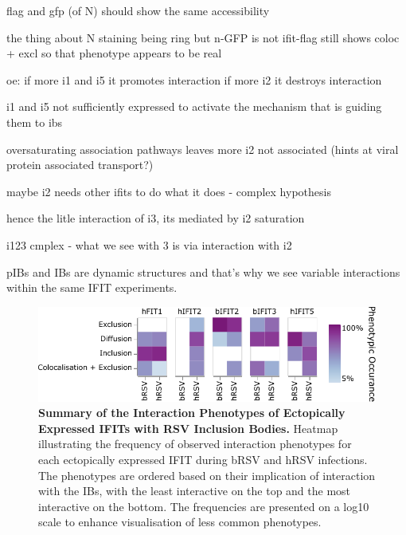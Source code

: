 flag and gfp (of N) should show the same accessibility

the thing about N staining being ring but n-GFP is not
ifit-flag still shows coloc + excl so that phenotype appears to be real

oe:
if more i1 and i5 it promotes interaction
if more i2 it destroys interaction


i1 and i5 not sufficiently expressed to activate the mechanism that is guiding them to ibs

oversaturating association pathways leaves more i2 not associated (hints at viral protein associated transport?)

maybe i2 needs other ifits to do what it does - complex hypothesis

hence the litle interaction of i3, its mediated by i2 saturation

i123 cmplex - what we see with 3 is via interaction with i2

pIBs and IBs are dynamic structures and that's why we see variable interactions within the same IFIT experiments.

\begin{figure}
    \centering
    \includegraphics[width=1\linewidth]{09. Chapter 4/Figs/heatmap-infection-transfection.pdf}
    \caption[Summary of the Interaction Phenotypes of Ectopically Expressed IFITs with RSV Inclusion Bodies.]{\textbf{Summary of the Interaction Phenotypes of Ectopically Expressed IFITs with RSV Inclusion Bodies.} Heatmap illustrating the frequency of observed interaction phenotypes for each ectopically expressed IFIT during bRSV and hRSV infections. The phenotypes are ordered based on their implication of interaction with the IBs, with the least interactive on the top and the most interactive on the bottom. The frequencies are presented on a log10 scale to enhance visualisation of less common phenotypes.}
    \label{fig:Summary of the Interaction Phenotypes of Ectopically Expressed IFITs with RSV Inclusion Bodies}
\end{figure}


